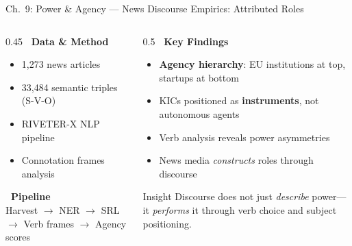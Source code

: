 \documentclass[aspectratio=169]{beamer}
\newcommand{\secmark}[1]{\hfill{\scriptsize\color{gray}#1}}
\begin{document}
\begin{frame}{Ch.~9: Power \& Agency --- News Discourse}
\secmark{Empirics: Attributed Roles}
\begin{columns}[T]
\begin{column}{0.45\textwidth}
    \textbf{\faDatabase\ Data \& Method}
    \begin{itemize}
        \item 1,273 news articles
        \item 33,484 semantic triples (S-V-O)
        \item RIVETER-X NLP pipeline
        \item Connotation frames analysis
    \end{itemize}
    \vspace{0.5em}
    \textbf{\faCogs\ Pipeline}\\
    {\small Harvest $\to$ NER $\to$ SRL $\to$ Verb frames $\to$ Agency scores}
\end{column}
\begin{column}{0.5\textwidth}
    \textbf{\faLightbulb[regular]\ Key Findings}
    \begin{itemize}
        \item \textbf{Agency hierarchy}: EU institutions at top, startups at bottom
        \item KICs positioned as \textbf{instruments}, not autonomous agents
        \item Verb analysis reveals power asymmetries
        \item News media \emph{constructs} roles through discourse
    \end{itemize}
    \vspace{0.3em}
    \begin{block}{\scriptsize Insight}
        \scriptsize Discourse does not just \emph{describe} power---it \emph{performs} it through verb choice and subject positioning.
    \end{block}
\end{column}
\end{columns}
\end{frame}
\end{document}
